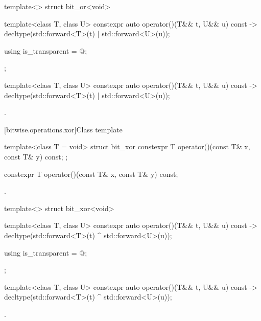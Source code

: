 %
\begin{itemdecl}
template<> struct bit_or<void> {
  template<class T, class U> constexpr auto operator()(T&& t, U&& u) const
    -> decltype(std::forward<T>(t) | std::forward<U>(u));

  using is_transparent = @\unspec@;
};
\end{itemdecl}

%
\begin{itemdecl}
template<class T, class U> constexpr auto operator()(T&& t, U&& u) const
  -> decltype(std::forward<T>(t) | std::forward<U>(u));
\end{itemdecl}

\begin{itemdescr}
\pnum
\returns
{}.
\end{itemdescr}

[bitwise.operations.xor]{Class template }

%
\begin{itemdecl}
template<class T = void> struct bit_xor {
  constexpr T operator()(const T& x, const T& y) const;
};
\end{itemdecl}

%
\begin{itemdecl}
constexpr T operator()(const T& x, const T& y) const;
\end{itemdecl}

\begin{itemdescr}
\pnum
\returns
{}.
\end{itemdescr}

%
\begin{itemdecl}
template<> struct bit_xor<void> {
  template<class T, class U> constexpr auto operator()(T&& t, U&& u) const
    -> decltype(std::forward<T>(t) ^ std::forward<U>(u));

  using is_transparent = @\unspec@;
};
\end{itemdecl}

%
\begin{itemdecl}
template<class T, class U> constexpr auto operator()(T&& t, U&& u) const
  -> decltype(std::forward<T>(t) ^ std::forward<U>(u));
\end{itemdecl}

\begin{itemdescr}
\pnum
\returns
{}.
\end{itemdescr}

